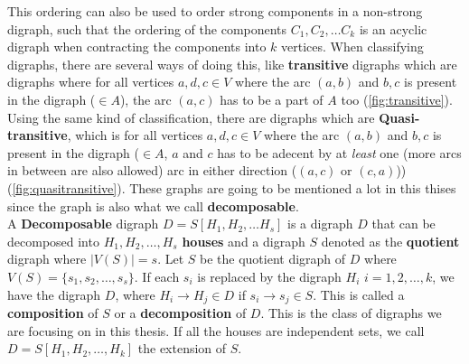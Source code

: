 This ordering can also be used to order strong components in a non-strong digraph, such that the ordering of the components $C_1,C_2,\dots C_k$ is an acyclic digraph when contracting the components into $k$ vertices. 
When classifying digraphs, there are several ways of doing this, like \textbf{transitive} digraphs which are digraphs where for all vertices $a,d,c\in V$ where the arc $(a,b)$ and $b,c$ is present in the digraph ($\in A$), the arc $(a,c)$ has to be a part of $A$ too (\autoref{fig:transitive}). 
Using the same kind of classification, there are digraphs which are \textbf{Quasi-transitive}, which is for all vertices $a,d,c\in V$ where the arc $(a,b)$ and $b,c$ is present in the digraph ($\in A$, $a$ and $c$ has to be adecent by at \textit{least} one (more arcs in between are also allowed) arc in either direction ($(a,c)$ or $(c,a)$)) (\autoref{fig:quasitransitive}). These graphs are going to be mentioned a lot in this thises since the graph is also what we call \textbf{decomposable}.\\
A \textbf{Decomposable} digraph $D=S[H_1,H_2,\dots H_s]$ is a digraph $D$ that can be decomposed into $H_1,H_2, \dots , H_s$ \textbf{houses} and a digraph $S$ denoted as the \textbf{quotient} digraph where $|V(S)|=s$. 
Let $S$ be the quotient digraph of $D$ where $V(S)=\lbrace s_1,s_2,\dots,s_s\rbrace$. 
If each $s_i$ is replaced by the digraph $H_i$ $i=1,2,\dots,k$, we have the digraph $D$, where $H_i\rightarrow H_j \in D$ if $s_i\rightarrow s_j\in S$. 
This is called a \textbf{composition} of $S$ or a \textbf{decomposition} of $D$.
This is the class of digraphs we are focusing on in this thesis. 
If all the houses are independent sets, we call $D=S[H_1,H_2,\dots ,H_k]$ the extension of $S$. 
